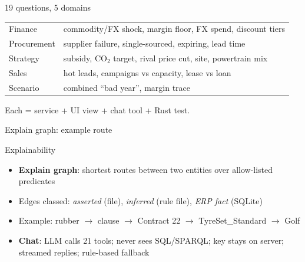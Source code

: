 \documentclass[aspectratio=169,11pt]{beamer}
\begin{document}
\begin{frame}{19 questions, 5 domains}
\small
\begin{tabular}{@{}ll@{}}
\toprule
Finance & commodity/FX shock, margin floor, FX spend, discount tiers\\
Procurement & supplier failure, single-sourced, expiring, lead time\\
Strategy & subsidy, CO$_2$ target, rival price cut, site, powertrain mix\\
Sales & hot leads, campaigns vs capacity, lease vs loan\\
Scenario & combined ``bad year'', margin trace\\
\bottomrule
\end{tabular}
\vspace{3mm}

Each = service + UI view + chat tool + Rust test.
\end{frame}

\begin{frame}{Explain graph: example route}
\centering
{}
\end{frame}

\begin{frame}{Explainability}
\begin{itemize}
\item \textbf{Explain graph}: shortest routes between two entities over allow-listed predicates
\item Edges classed: \textit{asserted} (file), \textit{inferred} (rule file), \textit{ERP fact} (SQLite)
\item Example: rubber $\to$ clause $\to$ Contract 22 $\to$ TyreSet\_Standard $\to$ Golf
\item \textbf{Chat}: LLM calls 21 tools; never sees SQL/SPARQL; key stays on server; streamed replies; rule-based fallback
\end{itemize}
\end{frame}
\end{document}
